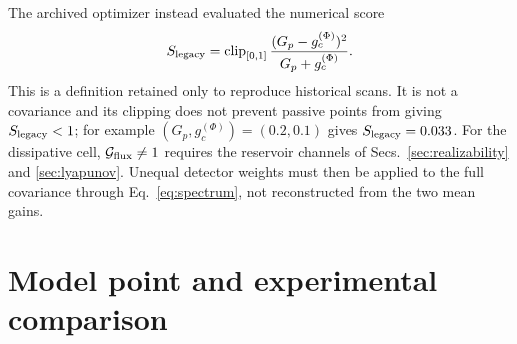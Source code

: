 \documentclass[11pt,a4paper]{article}
\begin{document}
The archived optimizer instead evaluated the numerical score
\begin{equation}
S_{\rm legacy}=\operatorname{clip}_{[0,1]}
\frac{(G_p-g_c^{(\Phi)})^2}{G_p+g_c^{(\Phi)}} .
\label{eq:ids-legacy}
\end{equation}
This is a definition retained only to reproduce historical scans. It is not a
covariance and its clipping does not prevent passive points from giving
$S_{\rm legacy}<1$; for example $(G_p,g_c^{(\Phi)})=(0.2,0.1)$ gives
$S_{\rm legacy}=0.033$. For the dissipative cell,
$\mathcal G_{\rm flux}\ne1$ requires the reservoir channels of
Secs.~\ref{sec:realizability} and \ref{sec:lyapunov}. Unequal detector weights
must then be applied to the full covariance through Eq.~\eqref{eq:spectrum},
not reconstructed from the two mean gains.

\clearpage
\section{Model point and experimental comparison}
\end{document}
